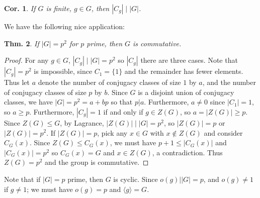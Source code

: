 \documentclass[12pt, a4paper]{book}
\newtheorem{theorem}{Thm.}[section]
\newtheorem{corollary}[theorem]{Cor.}
\theoremstyle{nonumberplain}
\newtheorem{proof}{Proof}
\begin{document}
\begin{corollary}
    If $G$ is finite, $g\in G$, then $|C_g|\mid|G|$.
\end{corollary}
We have the following nice application:
\begin{theorem}
    If $|G|=p^2$ for $p$ prime, then $G$ is commutative.
\end{theorem}
\begin{proof}
    For any $g\in G$, $|C_g|\mid|G|=p^2$ so $|C_g|$ there are three cases.
    Note that $|C_g|=p^2$ is impossible, since $C_1=\{1\}$ and the remainder has fewer elements.
    Thus let $a$ denote the number of conjugacy classes of size $1$ by $a$, and the number of conjugacy classes of size $p$ by $b$.
    Since $G$ is a disjoint union of conjugacy classes, we have $|G|=p^2=a+bp$ so that $p|a$.
    Furthermore, $a\neq 0$ since $|C_1|=1$, so $a\geq p$.
    Furthermore, $|C_g|=1$ if and only if $g\in Z(G)$, so $a=|Z(G)|\geq p$.
    Since $Z(G)\leq G$, by Lagrance, $|Z(G)|\mid|G|=p^2$, so $|Z(G)|=p$ or $|Z(G)|=p^2$.
    If $|Z(G)|=p$, pick any $x\in G$ with $x\notin Z(G)$ and consider $C_G(x)$.
    Since $Z(G)\leq C_G(x)$, we must have $p+1\leq |C_G(x)|$ and $|C_G(x)|=p^2$ so $C_G(x)=G$ and $x\in Z(G)$, a contradiction.
    Thus $Z(G)=p^2$ and the group is commutative.
\end{proof}
Note that if $|G|=p$ prime, then $G$ is cyclic.
Since $o(g)||G|=p$, and $o(g)\neq 1$ if $g\neq 1$; we must have $o(g)=p$ and $\langle g\rangle=G$.
\end{document}
